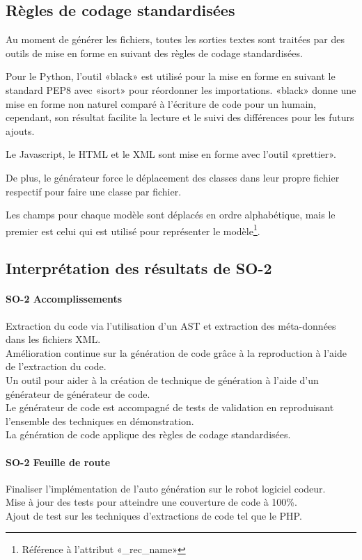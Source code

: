 \subsection {Règles de codage standardisées}

Au moment de générer les fichiers, toutes les sorties textes sont traitées par des outils de mise en forme en suivant des règles de codage standardisées.

Pour le Python, l’outil «black» est utilisé pour la mise en forme en suivant le standard PEP8 avec «isort» pour réordonner les importations. «black» donne une mise en forme non naturel comparé à l’écriture de code pour un humain, cependant, son résultat facilite la lecture et le suivi des différences pour les futurs ajouts.

Le Javascript, le HTML et le XML sont mise en forme avec l’outil «prettier».

De plus, le générateur force le déplacement des classes dans leur propre fichier respectif pour faire une classe par fichier.

Les champs pour chaque modèle sont déplacés en ordre alphabétique, mais le premier est celui qui est utilisé pour représenter le modèle\footnote{Référence à l'attribut «\_rec\_name»}.

\subsection{Interprétation des résultats de SO-2}

\paragraph{SO-2 Accomplissements}
Extraction du code via l’utilisation d’un AST et extraction des méta-données dans les fichiers XML.\\
Amélioration continue sur la génération de code grâce à la reproduction à l’aide de l’extraction du code.\\
Un outil pour aider à la création de technique de génération à l’aide d’un générateur de générateur de code.\\
Le générateur de code est accompagné de tests de validation en reproduisant l’ensemble des techniques en démonstration.\\
La génération de code applique des règles de codage standardisées.

\paragraph{SO-2 Feuille de route}
Finaliser l’implémentation de l'auto génération sur le robot logiciel codeur.\\
Mise à jour des tests pour atteindre une couverture de code à 100\%.\\
Ajout de test sur les techniques d’extractions de code tel que le PHP.

